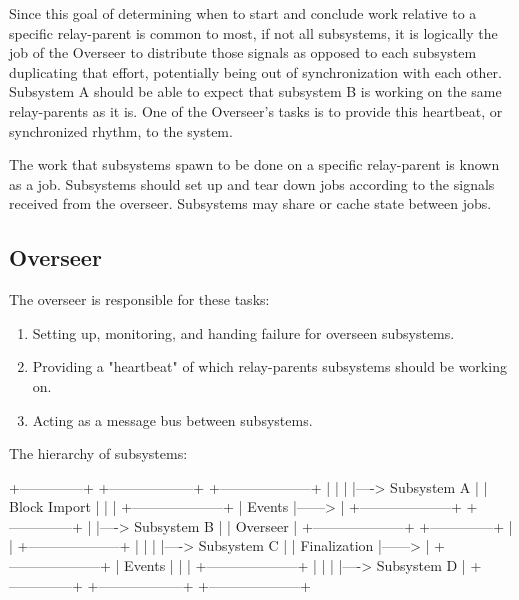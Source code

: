 Since this goal of determining when to start and conclude work relative to a
specific relay-parent is common to most, if not all subsystems, it is logically
the job of the Overseer to distribute those signals as opposed to each subsystem
duplicating that effort, potentially being out of synchronization with each
other. Subsystem A should be able to expect that subsystem B is working on the
same relay-parents as it is. One of the Overseer's tasks is to provide this
heartbeat, or synchronized rhythm, to the system.
\newline

The work that subsystems spawn to be done on a specific relay-parent is known as
a job. Subsystems should set up and tear down jobs according to the signals
received from the overseer. Subsystems may share or cache state between jobs.

\subsection{Overseer}

The overseer is responsible for these tasks:

\begin{enumerate}
    \item Setting up, monitoring, and handing failure for overseen subsystems.
    \item Providing a "heartbeat" of which relay-parents subsystems should be working on.
    \item Acting as a message bus between subsystems.
\end{enumerate}

The hierarchy of subsystems:

\begin{verbnobox}[\small]
+--------------+      +------------------+    +--------------------+
|              |      |                  |---->   Subsystem A      |
| Block Import |      |                  |    +--------------------+
|    Events    |------>                  |    +--------------------+
+--------------+      |                  |---->   Subsystem B      |
                      |   Overseer       |    +--------------------+
+--------------+      |                  |    +--------------------+
|              |      |                  |---->   Subsystem C      |
| Finalization |------>                  |    +--------------------+
|    Events    |      |                  |    +--------------------+
|              |      |                  |---->   Subsystem D      |
+--------------+      +------------------+    +--------------------+
\end{verbnobox}

